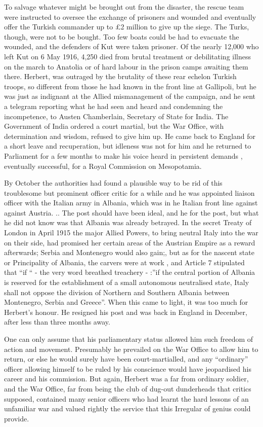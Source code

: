 To salvage whatever might be brought out from the disaster, the rescue team were instructed to oversee the exchange of prisoners and wounded and eventually offer the Turkish commander up to £2 million to give up the siege. The Turks, though, were not to be bought. Too few boats could be had to evacuate the wounded, and the defenders of Kut were taken prisoner. Of the nearly 12,000 who left Kut on 6 May 1916, 4,250 died from brutal treatment or debilitating illness on the march to Anatolia or of hard labour in the prison camps awaiting them there. Herbert, was outraged by the brutality of these rear echelon Turkish troops, so different from those he had known in the front line at Gallipoli, but he was just as indignant at the Allied mismanagement of the campaign, and he sent a telegram reporting what he had seen and heard and condemning the incompetence, to Austen Chamberlain, Secretary of State for India. The Government of India ordered a court martial, but the War Office, with determination and wisdom, refused to give him up. He came back to England for a short leave and recuperation, but idleness was not for him and he returned to Parliament for a few months to make his voice heard in persistent demands , eventually successful, for a Royal Commission on Mesopotamia.

By October the authorities had found a plausible way to be rid of this troublesome but prominent officer critic for a while and he was appointed liaison officer with the Italian army in Albania, which was in he Italian front line against against Austria. .. The post should have been ideal, and he for the post, but what he did not know was that Albania was already betrayed. In the secret Treaty of London in April 1915 the major Allied Powers, to bring neutral Italy into the war on their side, had promised her certain areas of the Austrian Empire as a reward afterwards; Serbia and Montenegro would also gain;, but as for the nascent state or Principality of Albania, the carvers were at work , and Article 7 stipulated that “if “ - the very word breathed treachery - :”if the central portion of Albania is reserved for the establishment of a small autonomous neutralised state, Italy shall not oppose the division of Northern and Southern Albania between Montenegro, Serbia and Greece”. When this came to light, it was too much for Herbert’s honour. He resigned his post and was back in England in December, after less than three months away.

One can only assume that his parliamentary status allowed him such freedom of action and movement. Presumably he prevailed on the War Office to allow him to return, or else he would surely have been court-martialled, and any “ordinary” officer allowing himself to be ruled by his conscience would have jeopardised his career and  his commission. But again, Herbert was a far from ordinary soldier, and the War Office, far from being the club of dug-out dunderheads that critics supposed, contained many senior officers who had learnt the hard lessons of an unfamiliar war and valued rightly the service that this Irregular of genius could provide. 


